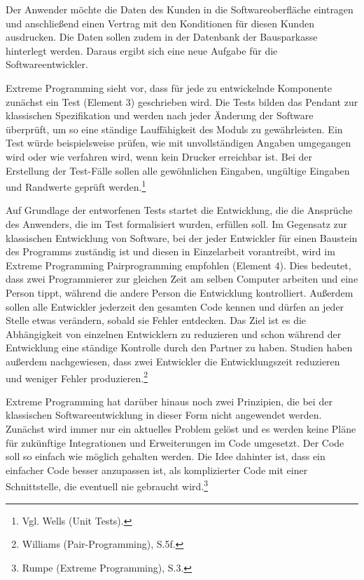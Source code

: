             Der Anwender möchte die Daten des Kunden in die Softwareoberfläche eintragen und anschließend einen Vertrag mit den Konditionen für diesen Kunden ausdrucken. Die Daten sollen zudem in der Datenbank der Bausparkasse hinterlegt werden. Daraus ergibt sich eine neue Aufgabe für die Softwareentwickler.

            Extreme Programming sieht vor, dass für jede zu entwickelnde Komponente zunächst ein Test (Element 3) geschrieben wird. Die Tests bilden das Pendant zur klassischen Spezifikation und werden nach jeder Änderung der Software überprüft, um so eine ständige Lauffähigkeit des Moduls zu gewährleisten. Ein Test würde beispielsweise prüfen, wie mit unvollständigen Angaben umgegangen wird oder wie verfahren wird, wenn kein Drucker erreichbar ist. Bei der Erstellung der Test-Fälle sollen alle gewöhnlichen Eingaben, ungültige Eingaben und Randwerte geprüft werden.\footnote{Vgl. Wells (Unit Tests).}

            Auf Grundlage der entworfenen Tests startet die Entwicklung, die die Ansprüche des Anwenders, die im Test formalisiert wurden, erfüllen soll. Im Gegensatz zur klassischen Entwicklung von Software, bei der jeder Entwickler für einen Baustein des Programms zuständig ist und diesen in Einzelarbeit vorantreibt, wird im Extreme Programming Pairprogramming empfohlen (Element 4). Dies bedeutet, dass zwei Programmierer zur gleichen Zeit am selben Computer arbeiten und eine Person tippt, während die andere Person die Entwicklung kontrolliert. Außerdem sollen alle Entwickler jederzeit den gesamten Code kennen und dürfen an jeder Stelle etwas verändern, sobald sie Fehler entdecken. Das Ziel ist es die Abhängigkeit von einzelnen Entwicklern zu reduzieren und schon während der Entwicklung eine ständige Kontrolle durch den Partner zu haben. Studien haben außerdem nachgewiesen, dass zwei Entwickler die Entwicklungszeit reduzieren und weniger Fehler produzieren.\footnote{Williams (Pair-Programming), S.5f.}

            Extreme Programming hat darüber hinaus noch zwei Prinzipien, die bei der klassischen Softwareentwicklung in dieser Form nicht angewendet werden. Zunächst wird immer nur ein aktuelles Problem gelöst und es werden keine Pläne für zukünftige Integrationen und Erweiterungen im Code umgesetzt. Der Code soll so einfach wie möglich gehalten werden. Die Idee dahinter ist, dass ein einfacher Code besser anzupassen ist, als komplizierter Code mit einer Schnittstelle, die eventuell nie gebraucht wird.\footnote{Rumpe (Extreme Programming), S.3.}

